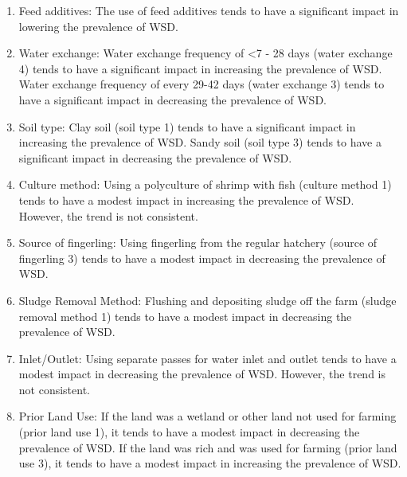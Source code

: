 \documentclass[journal,comsoc]{IEEEtran}
\begin{document}
\begin{enumerate}[itemsep=10pt]
    \item Feed additives: The use of feed additives tends to have a significant impact in lowering the prevalence of WSD.
    
    \item Water exchange: Water exchange frequency of \textless7 - 28 days (water exchange 4) tends to have a significant impact in increasing the prevalence of WSD. Water exchange frequency of every 29-42 days (water exchange 3) tends to have a significant impact in decreasing the prevalence of WSD.
    
    \item Soil type: Clay soil (soil type 1) tends to have a significant impact in increasing the prevalence of WSD. Sandy soil (soil type 3) tends to have a significant impact in decreasing the prevalence of WSD.
    
    \item Culture method: Using a polyculture of shrimp with fish (culture method 1) tends to have a modest impact in increasing the prevalence of WSD. However, the trend is not consistent.
    
    \item Source of fingerling: Using fingerling from the regular hatchery (source of fingerling 3) tends to have a modest impact in decreasing the prevalence of WSD.
    
    \item Sludge Removal Method: Flushing and depositing sludge off the farm (sludge removal method 1) tends to have a modest impact in decreasing the prevalence of WSD.
    
    \item Inlet/Outlet: Using separate passes for water inlet and outlet tends to have a modest impact in decreasing the prevalence of WSD. However, the trend is not consistent.
    
    \item Prior Land Use: If the land was a wetland or other land not used for farming (prior land use 1), it tends to have a modest impact in decreasing the prevalence of WSD. If the land was rich and was used for farming (prior land use 3), it tends to have a modest impact in increasing the prevalence of WSD.
\end{enumerate}
\end{document}
